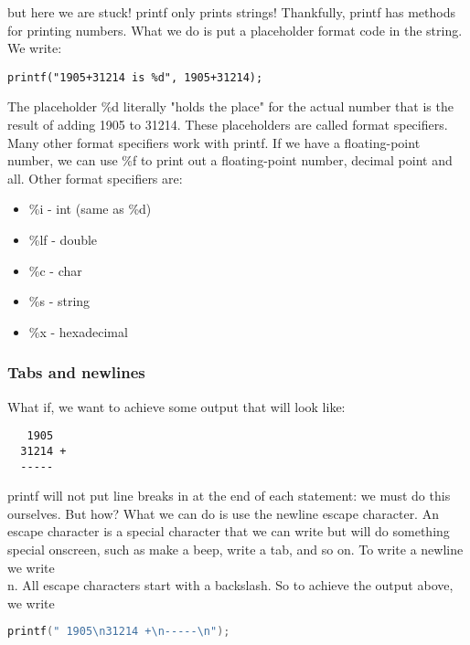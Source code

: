 but here we are stuck! printf only prints strings! Thankfully, printf has
methods for printing numbers. What we do is put a placeholder format code in
the string. We write:
\scriptsize
\begin{verbatim}
printf("1905+31214 is %d", 1905+31214);
\end{verbatim}
\normalsize

The placeholder \%d literally "holds the place" for the actual number that is
the result of adding 1905 to 31214.  These placeholders are called format
specifiers. Many other format specifiers work with printf. If we have a
floating-point number, we can use \%f to print out a floating-point number,
decimal point and all. Other format specifiers are:
\begin{itemize}
\item \%i - int (same as \%d)
\item \%lf - double
\item \%c - char
\item \%s - string
\item \%x - hexadecimal
\end{itemize}

\subsubsection{Tabs and newlines}
What if, we want to achieve some output that will look like:
\scriptsize
\begin{verbatim}
   1905 
  31214 +
  -----
\end{verbatim}
\normalsize

printf will not put line breaks in at the end of each statement: we must do
this ourselves. But how?  What we can do is use the newline escape character.
An escape character is a special character that we can write but will do
something special onscreen, such as make a beep, write a tab, and so on. To
write a newline we write \\n. All escape characters start with a backslash.  So
to achieve the output above, we write
\lstset{basicstyle=\scriptsize, numbers=left, captionpos=b, tabsize=4}
\begin{lstlisting}[caption=Section \thesection listing \arabic{inout},language={C},
breaklines=true,xleftmargin=15pt,label=lst:section\thesection listing\arabic{inout}]
printf(" 1905\n31214 +\n-----\n");
\end{lstlisting}

